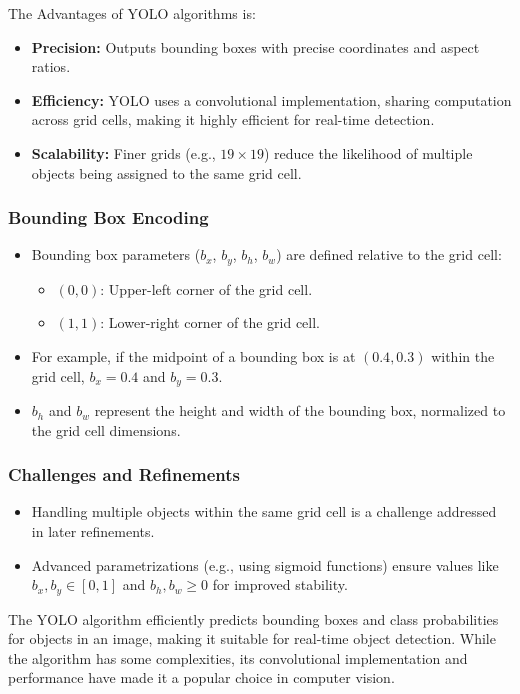 \documentclass[letterpaper,12pt,notitlepage,twoside]{report}
\begin{document}
The Advantages of YOLO algorithms is:
\begin{itemize}[nosep]
    \item \textbf{Precision:} Outputs bounding boxes with precise coordinates and aspect ratios.
    \item \textbf{Efficiency:} YOLO uses a convolutional implementation, sharing computation across grid cells, making it highly efficient for real-time detection.
    \item \textbf{Scalability:} Finer grids (e.g., $19 \times 19$) reduce the likelihood of multiple objects being assigned to the same grid cell.
\end{itemize}

\subsubsection*{Bounding Box Encoding}
\begin{itemize}
    \item Bounding box parameters ($b_x$, $b_y$, $b_h$, $b_w$) are defined relative to the grid cell:
    \begin{itemize}
        \item $(0, 0)$: Upper-left corner of the grid cell.
        \item $(1, 1)$: Lower-right corner of the grid cell.
    \end{itemize}
    \item For example, if the midpoint of a bounding box is at $(0.4, 0.3)$ within the grid cell, $b_x = 0.4$ and $b_y = 0.3$.
    \item $b_h$ and $b_w$ represent the height and width of the bounding box, normalized to the grid cell dimensions.
\end{itemize}

\subsubsection*{Challenges and Refinements}
\begin{itemize}
    \item Handling multiple objects within the same grid cell is a challenge addressed in later refinements.
    \item Advanced parametrizations (e.g., using sigmoid functions) ensure values like $b_x, b_y \in [0, 1]$ and $b_h, b_w \geq 0$ for improved stability.
\end{itemize}

The YOLO algorithm efficiently predicts bounding boxes and class probabilities for objects in an image, making it suitable for real-time object detection. While the algorithm has some complexities, its convolutional implementation and performance have made it a popular choice in computer vision. 
\end{document}
